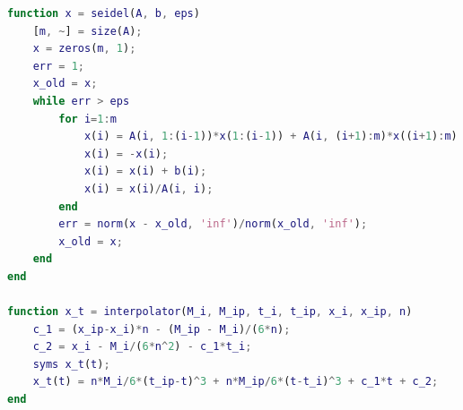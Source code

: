 \documentclass{article}
\begin{document}
\begin{lstlisting}[language=Matlab]
function x = seidel(A, b, eps)
    [m, ~] = size(A);
    x = zeros(m, 1);
    err = 1;
    x_old = x;
    while err > eps
        for i=1:m
            x(i) = A(i, 1:(i-1))*x(1:(i-1)) + A(i, (i+1):m)*x((i+1):m);
            x(i) = -x(i);
            x(i) = x(i) + b(i);
            x(i) = x(i)/A(i, i);
        end
        err = norm(x - x_old, 'inf')/norm(x_old, 'inf');
        x_old = x;
    end
end

function x_t = interpolator(M_i, M_ip, t_i, t_ip, x_i, x_ip, n)
    c_1 = (x_ip-x_i)*n - (M_ip - M_i)/(6*n);
    c_2 = x_i - M_i/(6*n^2) - c_1*t_i;
    syms x_t(t);
    x_t(t) = n*M_i/6*(t_ip-t)^3 + n*M_ip/6*(t-t_i)^3 + c_1*t + c_2;
end
        \end{lstlisting}
\end{document}
